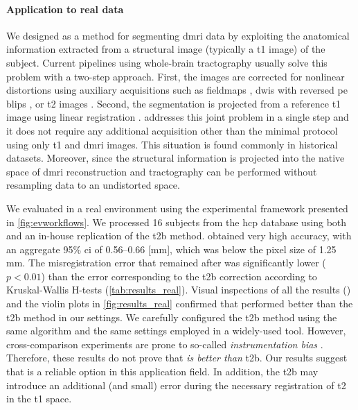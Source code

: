 \paragraph*{Application to real data}
We designed \regseg{} as a method for segmenting \gls*{dmri} data by exploiting the
  anatomical information extracted from a structural image (typically a \gls*{t1} image)
  of the subject.
Current pipelines using whole-brain tractography usually solve this problem with a two-step approach.
First, the images are corrected for nonlinear distortions using auxiliary acquisitions
  such as fieldmaps \citep{jezzard_correction_1995}, \glspl*{dwi} with reversed \gls*{pe}
  blips \citep{chiou_simple_2000}, or \gls*{t2} images \citep{kybic_unwarping_2000}.
Second, the segmentation is projected from a reference \gls*{t1} image using linear
  registration \citep{greve_accurate_2009}.
\Regseg{} addresses this joint problem in a single step and it does not require any additional
  acquisition other than the minimal protocol using only \gls*{t1} and \gls*{dmri} images.
This situation is found commonly in historical datasets.
Moreover, since the structural information is projected into the native space of \gls*{dmri}
  reconstruction and tractography can be performed without resampling data to an undistorted
  space.

We evaluated \regseg{} in a real environment using the experimental framework presented
  in \autoref{fig:evworkflows}.
We processed 16 subjects from the \gls*{hcp} database using both \regseg{}
  and an in-house replication of the \acrfull*{t2b} method.
\Regseg{} obtained very high accuracy, with an aggregate 95\% \gls*{ci} of 0.56--0.66 [mm], which was
  below the pixel size of 1.25 mm.
The misregistration error that remained after \regseg{} was significantly lower ($p < 0.01$) than the
  error corresponding to the \gls*{t2b} correction according to Kruskal-Wallis H-tests
  (\autoref{tab:results_real}).
Visual inspections of all the results () and the violin plots in
  \autoref{fig:results_real} confirmed that \regseg{} performed better than the \gls*{t2b} method
  in our settings.
We carefully configured the \gls*{t2b} method using the same algorithm and the
  same settings employed in a widely-used tool.
However, cross-comparison experiments are prone to so-called \emph{instrumentation bias}
  \citep{tustison_instrumentation_2013}.
Therefore, these results do not prove that \regseg{} \emph{is better than} \gls*{t2b}.
Our results suggest that \regseg{} is a reliable option in this application field.
In addition, the \gls*{t2b} may introduce an additional (and small) error during the necessary
  registration of \gls*{t2} in the \gls*{t1} space.

